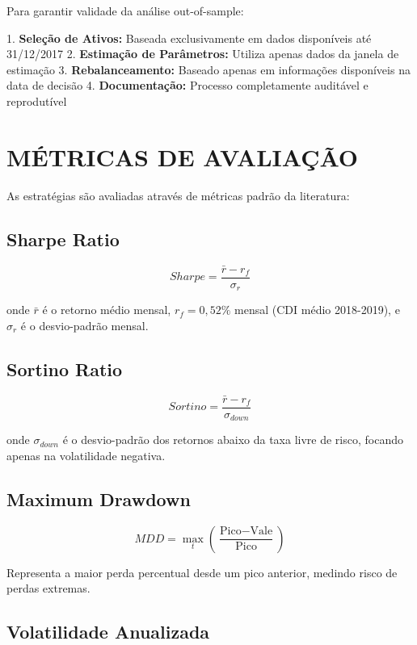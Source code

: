 Para garantir validade da análise out-of-sample:

1. \textbf{Seleção de Ativos:} Baseada exclusivamente em dados disponíveis até 31/12/2017
2. \textbf{Estimação de Parâmetros:} Utiliza apenas dados da janela de estimação
3. \textbf{Rebalanceamento:} Baseado apenas em informações disponíveis na data de decisão
4. \textbf{Documentação:} Processo completamente auditável e reprodutível

\section{MÉTRICAS DE AVALIAÇÃO}

As estratégias são avaliadas através de métricas padrão da literatura:

\subsection{Sharpe Ratio}

\begin{equation}
Sharpe = \frac{\bar{r} - r_f}{\sigma_r}
\end{equation}

onde $\bar{r}$ é o retorno médio mensal, $r_f = 0,52\%$ mensal (CDI médio 2018-2019), e $\sigma_r$ é o desvio-padrão mensal.

\subsection{Sortino Ratio}

\begin{equation}
Sortino = \frac{\bar{r} - r_f}{\sigma_{down}}
\end{equation}

onde $\sigma_{down}$ é o desvio-padrão dos retornos abaixo da taxa livre de risco, focando apenas na volatilidade negativa.

\subsection{Maximum Drawdown}

\begin{equation}
MDD = \max_{t} \left( \frac{\text{Pico} - \text{Vale}}{\text{Pico}} \right)
\end{equation}

Representa a maior perda percentual desde um pico anterior, medindo risco de perdas extremas.

\subsection{Volatilidade Anualizada}

